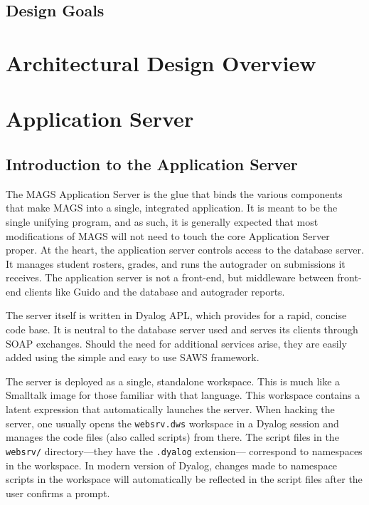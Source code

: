 \section{Design Goals}



\chapter{Architectural Design Overview}

\chapter{Application Server}

\section{Introduction to the Application Server}

The MAGS Application Server is the glue that binds the various components that 
make MAGS into a single, integrated application. It is meant to be the single
unifying program, and as such, it is generally expected that most modifications
of MAGS will not need to touch the core Application Server proper. At the 
heart, the application server controls access to the database server. It manages
student rosters, grades, and runs the autograder on submissions it receives.
The application server is not a front-end, but middleware between front-end
clients like Guido and the database and autograder reports.

The server itself is written in Dyalog APL, which provides for a rapid, concise 
code base. It is neutral to the database server used and serves its clients 
through SOAP exchanges. Should the need for additional services arise, 
they are easily added using the simple and easy to use SAWS framework.

The server is deployed as a single, standalone workspace. This is much like a 
Smalltalk image for those familiar with that language. This workspace contains
a latent expression that automatically launches the server. When hacking the 
server, one usually opens the {\tt websrv.dws} workspace in a Dyalog session
and manages the code files (also called scripts) from there. The script files 
in the {\tt websrv/} directory---they have the {\tt .dyalog} extension---
correspond to namespaces in the workspace. In modern version of Dyalog, 
changes made to namespace scripts in the workspace will automatically be 
reflected in the script files after the user confirms a prompt.

